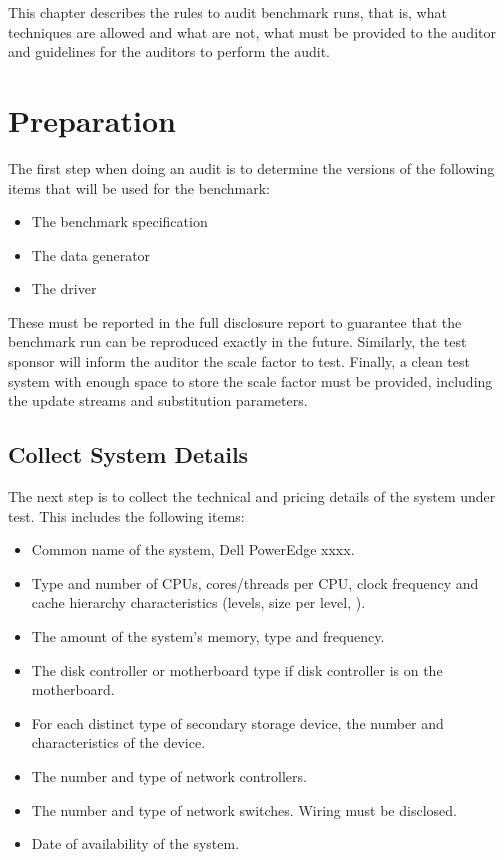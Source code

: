 This chapter describes the rules to audit benchmark runs, that is, what
techniques are allowed and what are not, what must be provided to the auditor
and guidelines for the auditors to perform the audit.

\section{Preparation}

The first step when doing an audit is to determine the versions of the
following items that will be used for the benchmark:

\begin{itemize}
  \item The benchmark specification
  \item The data generator
  \item The driver
\end{itemize}

These must be reported in the full disclosure report to guarantee that the
benchmark run can be reproduced exactly in the future. Similarly, the test
sponsor will inform the auditor the scale factor to test. Finally, a clean test
system with enough space to store the scale factor must be provided, including
the update streams and substitution parameters.


\subsection{Collect System Details}

The next step is to collect the technical and pricing details of the system
under test. This includes the following items:

\begin{itemize}
\item Common name of the system, \eg Dell PowerEdge xxxx.
\item Type and number of CPUs, cores/threads per CPU, clock frequency and cache hierarchy characteristics (levels, size per level, \etc).
\item The amount of the system's memory, type and frequency.
\item The disk controller or motherboard type if disk controller is on the motherboard.
\item For each distinct type of secondary storage device, the number and characteristics of the device.
\item The number and type of network controllers.
\item The number and type of network switches. Wiring must be disclosed.
\item Date of availability of the system.
\end{itemize}

